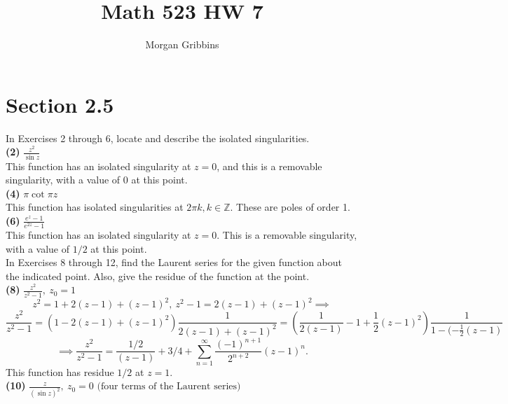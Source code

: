 \documentclass[12pt,letterpaper]{article}
\title{Math 523 HW 7}
\author{Morgan Gribbins}
\date{}
\begin{document}
	
\maketitle

\section*{Section 2.5}
In Exercises 2 through 6, locate and describe the isolated singularities.\\

\textbf{(2)} \(\frac{z^{2}}{\sin z}\) \\

This function has an isolated singularity at \(z=0\), and this is a removable singularity, with a value of \(0\) at this point. \\

\textbf{(4)} \(\pi \cot \pi z\) \\

This function has isolated singularities at \(2\pi k, k\in \mathbb{Z}\). These are poles of order 1. \\

\textbf{(6)} \(\frac{e^{z}-1}{e^{2z}-1}\) \\

This function has an isolated singularity at \(z=0\). This is a removable singularity, with a value of \(1/2\) at this point. \\

In Exercises 8 through 12, find the Laurent series for the given function about the indicated point. Also, give the residue of the function at the point. \\

\textbf{(8)} \(\frac{z^{2}}{z^{2}-1},\ z_{0} = 1\) \\

\[z^{2} = 1 + 2(z-1) + (z-1)^{2},\ z^{2}-1 = 2(z-1) + (z-1)^{2} \implies\] \[\frac{z^{2}}{z^{2}-1} = (1-2(z-1)+(z-1)^{2})\frac{1}{2(z-1) + (z-1)^{2}} = \left(\frac{1}{2(z-1)} - 1 + \frac{1}{2}(z-1)^{2}\right)\frac{1}{1-(-\frac{1}{2}(z-1)}\] \[\implies \frac{z^{2}}{z^{2}-1} = \frac{1/2}{(z-1)} + 3/4 + \sum_{n=1}^{\infty} \frac{(-1)^{n+1}}{2^{n+2}}(z-1)^{n}.\] This function has residue \(1/2\) at \(z=1\). \\

\textbf{(10)} \(\frac{z}{(\sin z )^{2}},\ z_{0} = 0 \text{ (four terms of the Laurent series)}\) \\
\end{document}
